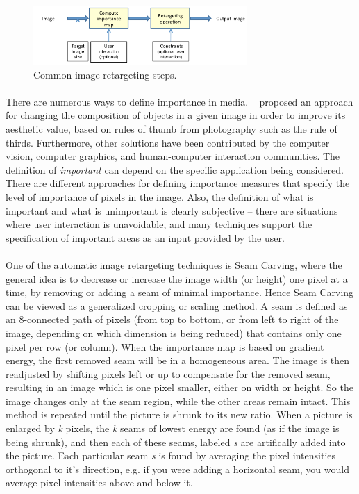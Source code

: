 \documentclass[conference]{acmsiggraph}
\begin{document}
\begin{figure}[ht]
  \centering
  \includegraphics[width=3.2in]{images/retargeting}
  \caption{Common image retargeting steps.}
\end{figure}

\paragraph{}
There are numerous ways to define importance in media. ~\cite{Liu2010} proposed an approach for changing the composition of objects in a given image in order to improve its aesthetic value, based on rules of thumb from photography such as the rule of thirds. Furthermore, other solutions have been contributed by the computer vision, computer graphics, and human-computer interaction
communities. The definition of \emph{important} can depend on the specific application being considered. There are different approaches for defining importance measures that specify the level of importance of pixels in the image. Also, the definition of what is important and what is unimportant is clearly subjective -- there are situations where user interaction is unavoidable, and many techniques support the specification of important areas as an input provided by the user.


\paragraph{}
One of the automatic image retargeting techniques is Seam Carving, where the general idea is to decrease or increase the image width (or height) one pixel at a time, by removing or adding a seam of minimal importance. Hence Seam Carving can be viewed as a generalized cropping or scaling method. A seam is defined as an 8-connected path of pixels (from top to bottom, or from left to right of the image, depending on which dimension is being reduced) that contains only one pixel per row (or column). When the importance map is based on gradient energy, the first removed seam will be in a homogeneous area. The image is then readjusted by shifting pixels left or up to compensate for the removed seam, resulting in an image which is one pixel smaller, either on width or height. So the image changes only at the seam region, while the other areas remain intact.  This method is repeated until the picture is shrunk to its new ratio.  When a picture is enlarged by \emph{k} pixels, the \emph{k} seams of lowest energy are found (as if the image is being shrunk), and then each of these seams, labeled \emph{s} are artifically added into the picture.  Each particular seam \emph{s}  is found by averaging the pixel intensities orthogonal to it's direction, e.g. if you were adding a horizontal seam, you would average pixel intensities above and below it.  
\end{document}
